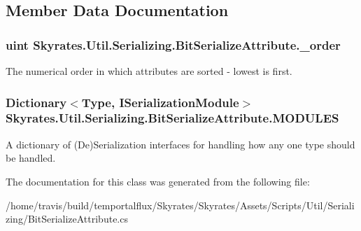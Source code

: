 \subsection{Member Data Documentation}
\hypertarget{class_skyrates_1_1_util_1_1_serializing_1_1_bit_serialize_attribute_aa9a934a18a1edd047a3c789b74bb1ed7}{
\subsubsection[{\-\_\-order}]{\setlength{\rightskip}{0pt plus 5cm}uint Skyrates.\-Util.\-Serializing.\-Bit\-Serialize\-Attribute.\-\_\-order}}\label{class_skyrates_1_1_util_1_1_serializing_1_1_bit_serialize_attribute_aa9a934a18a1edd047a3c789b74bb1ed7}


The numerical order in which attributes are sorted -\/ lowest is first. 

\hypertarget{class_skyrates_1_1_util_1_1_serializing_1_1_bit_serialize_attribute_a089230f5e79f28cef11f6951b3b83053}{
\subsubsection[{M\-O\-D\-U\-L\-E\-S}]{\setlength{\rightskip}{0pt plus 5cm}Dictionary$<$Type, {\bf I\-Serialization\-Module}$>$ Skyrates.\-Util.\-Serializing.\-Bit\-Serialize\-Attribute.\-M\-O\-D\-U\-L\-E\-S\hspace{0.3cm}{\ttfamily [static]}}}\label{class_skyrates_1_1_util_1_1_serializing_1_1_bit_serialize_attribute_a089230f5e79f28cef11f6951b3b83053}


A dictionary of (De)Serialization interfaces for handling how any one type should be handled. 



The documentation for this class was generated from the following file\-:\begin{DoxyCompactItemize}
\item 
/home/travis/build/temportalflux/\-Skyrates/\-Skyrates/\-Assets/\-Scripts/\-Util/\-Serializing/Bit\-Serialize\-Attribute.\-cs\end{DoxyCompactItemize}
